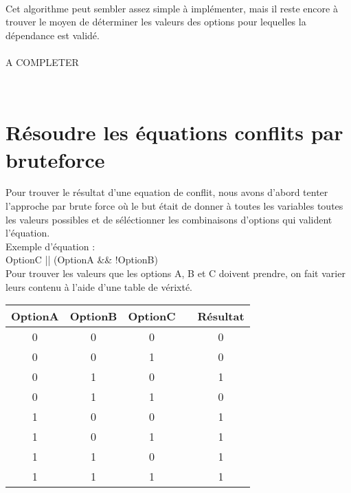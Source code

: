 \documentclass[16pts]{report}
\begin{document}
\\

Cet algorithme peut sembler assez simple à implémenter, mais il reste encore
à trouver le moyen de déterminer les valeurs des options pour lequelles la
dépendance est validé.\\

\\

A COMPLETER

\\

\section{Résoudre les équations conflits par bruteforce}
\label{sec:Résoudre les équations conflits par bruteforce}

Pour trouver le résultat d'une equation de conflit, nous avons d'abord tenter 
l'approche par brute force où le but était de donner à toutes les variables
toutes les valeurs possibles et de séléctionner les combinaisons d'options
qui valident l'équation.
\\

Exemple d'équation : 
\\

OptionC || (OptionA && !OptionB)
\\

Pour trouver les valeurs que les options A, B et C doivent prendre, on 
fait varier leurs contenu à l'aide d'une table de vérixté.
\\

\begin{tabular}{|c|c|c|c|c|}
    \hline
    OptionA & OptionB & OptionC && Résultat\\
    \hline
    \hline
    0 & 0 & 0 && 0\\
    \hline
    0 & 0 & 1 && 0\\
    \hline
    0 & 1 & 0 && 1\\
    \hline
    0 & 1 & 1 && 0\\
    \hline
    1 & 0 & 0 && 1\\
    \hline
    1 & 0 & 1 && 1\\
    \hline
    1 & 1 & 0 && 1\\
    \hline
    1 & 1 & 1 && 1\\
    \hline

\end{tabular}


\\
\end{document}
